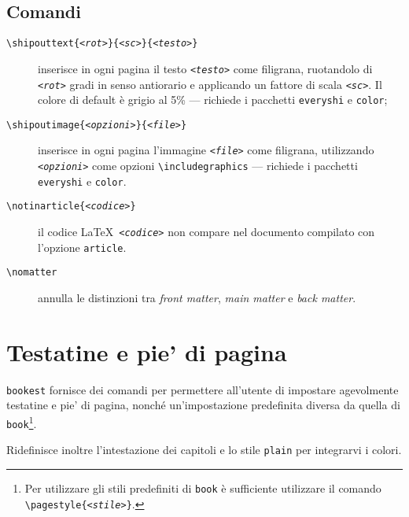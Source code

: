 \documentclass[a4paper,oneside,centered,noparindent,noparskip]{bookest}
\begin{document}
\subsection{Comandi}
\begin{description}
 \item [\texttt{\textbackslash shipouttext\{\textit{<rot>}\}\{\textit{<sc>}\}\{\textit{<testo>}\}}] inserisce in ogni pagina il testo \texttt{\textit{<testo>}} come filigrana, ruotandolo di \texttt{\textit{<rot>}} gradi in senso antiorario e applicando un fattore di scala \texttt{\textit{<sc>}}. Il colore di default è grigio al 5\% --- richiede i pacchetti \texttt{everyshi} e \texttt{color};
 \item [\texttt{\textbackslash shipoutimage\{\textit{<opzioni>}\}\{\textit{<file>}\}}] inserisce in ogni pagina l'immagine \texttt{\textit{<file>}} come filigrana, utilizzando \texttt{\textit{<opzioni>}} come opzioni \texttt{\textbackslash includegraphics} --- richiede i pacchetti \texttt{everyshi} e \texttt{color}.
\end{description}

\ppar
\begin{description}
 \item [\texttt{\textbackslash notinarticle\{\textit{<codice>}\}}] il codice \LaTeX\ \texttt{\textit{<codice>}} non compare nel documento compilato con l'opzione \texttt{article}.
 \item [\texttt{\textbackslash nomatter}] annulla le distinzioni tra \textit{front matter}, \textit{main matter} e \textit{back matter}.
\end{description}

\section{Testatine e pie' di pagina}
\texttt{bookest} fornisce dei comandi per permettere all'utente di impostare agevolmente testatine e pie' di pagina, nonché un'impostazione predefinita diversa da quella di \texttt{book}\footnote{Per utilizzare gli stili predefiniti di \texttt{book} è sufficiente utilizzare il comando \texttt{\textbackslash pagestyle\{\textit{<stile>}\}}.}.

\ppar
Ridefinisce inoltre l'intestazione dei capitoli e lo stile \texttt{plain} per integrarvi i colori.
\end{document}

